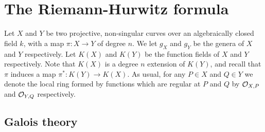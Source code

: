 \chapter{The Riemann-Hurwitz formula} \label{Chapter:hurwitzformula}


Let $X$ and $Y$ be two projective, non-singular curves over an algebraically closed field $k$, with a map $\pi \colon X \rightarrow Y$ of degree $n$.
We let $g_X$ and $g_Y$ be the genera of $X$ and $Y$ respectively.
Let $K(X)$ and $K(Y)$ be the function fields of $X$ and $Y$ respectively.
Note that $K(X)$ is a degree $n$ extension of $K(Y)$, and recall that $\pi$ induces a map $\pi^*\colon K(Y) \rightarrow K(X)$.
As usual, for any $P \in X$ and $Q \in Y$ we denote the local ring formed by functions which are regular at $P$ and $Q$ by ${\cal O}_{X,P}$ and ${\cal O}_{Y,Q}$ respectively.

\section{Galois theory}\label{sectiongaloistheory}
    
